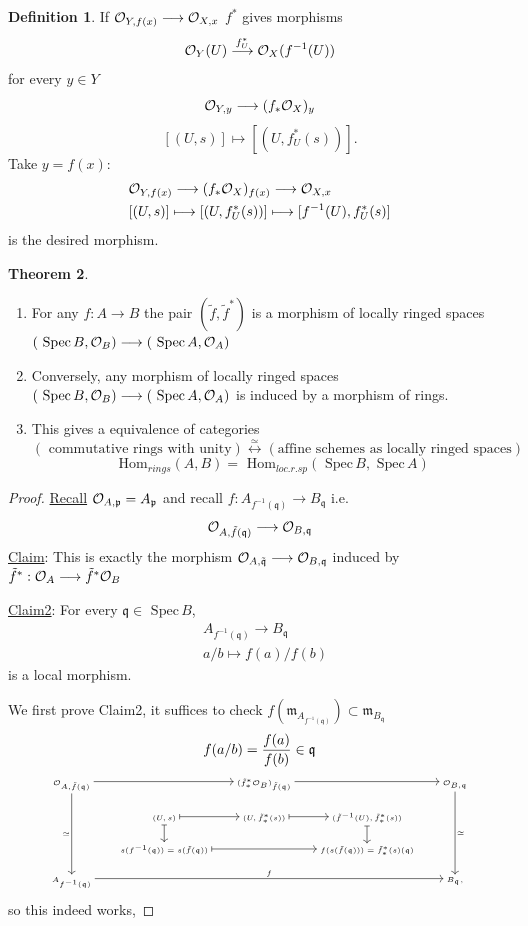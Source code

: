 \documentclass[11pt]{article}
\theoremstyle{definition}
\newtheorem{thm}{Theorem}[section]
\newtheorem{dfn}[thm]{Definition}
\renewcommand{\hom}{\text{ Hom}}
\newcommand{\spec}{\text{ Spec}\,}
\newcommand{\scm}{{\mathfrak m}}
\newcommand{\scp}{{\mathfrak p}}
\newcommand{\scq}{\mathfrak q}
\newcommand{\calo}{{\cal O}}
\newcommand{\lrta}{\longrightarrow}
\newcommand{\llrta}{\longleftrightarrow}
\begin{document}
\begin{dfn}
If $\calo_{Y,f(x)}\lrta \calo_{X,x}$ $f^*$ gives  morphisms 
$$
\calo_Y(U)\overset{f^*_U}{\lrta}\calo_X(f^{-1}(U))
$$
for every $y\in Y$
$$
\calo_{Y,y}\lrta (f_*\calo_X)_y
$$
$$
[(U,s)]\longmapsto [(U,f^*_U(s))].
$$
Take $y=f(x):$
$$
\begin{aligned}
&\calo_{Y,f(x)}\lrta (f_*\calo_X)_{f(x)}\lrta \calo_{X,x}\\
& [(U,s)]\longmapsto [(U,f^*_U(s))]\longmapsto[f^{-1}(U),f^*_U(s)]
\end{aligned}
$$
is the desired morphism.
\end{dfn}
\begin{thm}\ 
\begin{enumerate}[label=(\arabic*)]
\item For any $f: A\lrta B$ the pair $(\tilde{f},\tilde{f}^*)$ is a morphism  of locally ringed spaces $(\spec B,\calo_B)\lrta (\spec A,\calo_A)$
\item Conversely, any morphism of locally ringed spaces $(\spec B,\calo_B)\lrta (\spec A,\calo_A)$ is induced by a morphism of rings.
\item This gives a equivalence of categories
$$
\left( \text{ commutative rings with unity}\right)\overset{\simeq}{\llrta}\left(\text{affine schemes as locally ringed spaces}\right)
$$
$$
\hom_{rings}(A,B)=\hom_{loc.r.sp}(\spec B,\spec A)
$$
\end{enumerate}
\begin{proof}
\underline{Recall} $\calo_{A,\scp}=A_\scp$ and recall $f:A_{f^{-1}(\scq)}\lrta B_\scq$ i.e.
$$
\calo_{A,\tilde{f}(\scq)}\lrta \calo_{B,\scq}
$$
\underline{Claim}: This is exactly the morphism $\calo_{A,\tilde{\scq}}\lrta \calo_{B,\scq}$ induced by $\tilde{f}^*:\calo_A\lrta \tilde{f}^*\calo_B$

\underline{Claim2}: For every $\scq\in\spec B$, 
$$
\begin{aligned}
& A_{f^{-1}(\scq)}\lrta B_\scq\\
&a/b\longmapsto f(a)/f(b)
\end{aligned}
$$
is a local morphism.

We first prove Claim2, it suffices to check $f(\scm_{A_{f^{-1}(\scq)}})\subset \scm_{B_\scq}$
$$
f(a/b)=\frac{f(a)}{f(b)}\in \scq\\
$$
$$
\tiny
\begin{tikzcd}
\calo_{A,\tilde{f}(\scq)} \arrow[ddd, "\simeq"'] \arrow[rr] &  & (\tilde{f}^*_*\calo_B)_{\tilde{f}(\scq)} \arrow[rr] &  & \calo_{B,\scq} \arrow[ddd, "\simeq"] \\
 & (U,s) \arrow[d, maps to] \arrow[r, maps to] & (U,\tilde{f}^*_*(s)) \arrow[r, maps to] & (\tilde{f}^{-1}(U),\tilde{f}_*^*(s)) \arrow[d, maps to] &  \\
 & s(f^{-1}(\scq))=s(\tilde{f}(\scq)) \arrow[rr, maps to] &  & f(s(\tilde{f}(\scq)))=\tilde{f}^*_*(s)(\scq) &  \\
A_{f^{-1}(\scq)} \arrow[rrrr, "f"] &  &  &  & B_\scq,
\end{tikzcd}
$$
so this indeed works,


\end{proof}
\end{thm}
\end{document}
